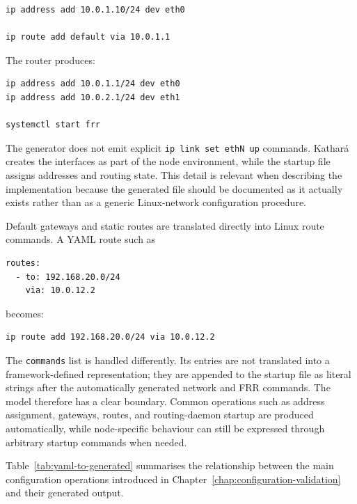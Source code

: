 \begin{lstlisting}[language=bash,caption={Generated startup file for the client node.},label={lst:client-startup}]
ip address add 10.0.1.10/24 dev eth0

ip route add default via 10.0.1.1
\end{lstlisting}

The router produces:

\begin{lstlisting}[language=bash,caption={Generated startup file for the router node.},label={lst:router-startup}]
ip address add 10.0.1.1/24 dev eth0
ip address add 10.0.2.1/24 dev eth1

systemctl start frr
\end{lstlisting}

The generator does not emit explicit \texttt{ip link set ethN up} commands.
Kathar\'a creates the interfaces as part of the node environment, while the
startup file assigns addresses and routing state. This detail is relevant when
describing the implementation because the generated file should be documented
as it actually exists rather than as a generic Linux-network configuration
procedure.

Default gateways and static routes are translated directly into Linux route
commands. A YAML route such as

\begin{lstlisting}[caption={Static route represented in YAML.},label={lst:static-route-yaml}]
routes:
  - to: 192.168.20.0/24
    via: 10.0.12.2
\end{lstlisting}

becomes:

\begin{lstlisting}[language=bash,caption={Command generated from a static route.},label={lst:static-route-generated}]
ip route add 192.168.20.0/24 via 10.0.12.2
\end{lstlisting}

The \texttt{commands} list is handled differently. Its entries are not
translated into a framework-defined representation; they are appended to the
startup file as literal strings after the automatically generated network and
FRR commands. The model therefore has a clear boundary. Common operations such
as address assignment, gateways, routes, and routing-daemon startup are
produced automatically, while node-specific behaviour can still be expressed
through arbitrary startup commands when needed.

Table~\ref{tab:yaml-to-generated} summarises the relationship between the main
configuration operations introduced in Chapter~\ref{chap:configuration-validation}
and their generated output.

